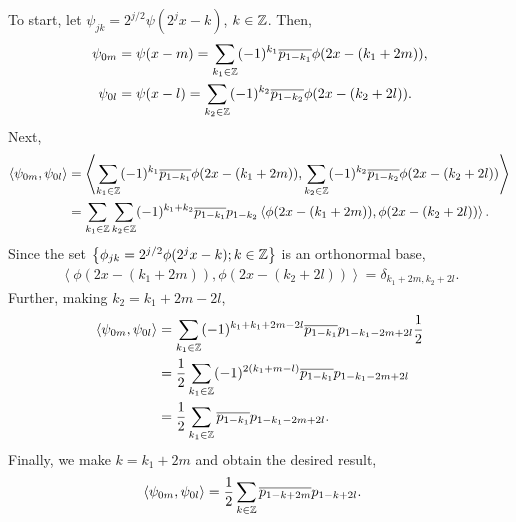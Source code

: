 \begin{questions}

\begin{solution}
To start, let $\psi_{jk}=2^{j/2}\psi(2^jx-k)$, $k\in\mathbb{Z}$. Then,
\begin{align*}
\psi_{0m}&=\psi(x-m)=\sum_{k_1\in\mathbb{Z}}(-1)^{k_1}\overline{p_{1-k_1}}\phi(2x-(k_1+2m)),\\
\psi_{0l}&=\psi(x-l)=\sum_{k_2\in\mathbb{Z}}(-1)^{k_2}\overline{p_{1-k_2}}\phi(2x-(k_2+2l)).
\end{align*}
Next, 
\begin{align*}
\left\langle \psi_{0m},\psi_{0l}\right\rangle&=\left\langle \sum_{k_1\in\mathbb{Z}}(-1)^{k_1}\overline{p_{1-k_1}}\phi(2x-(k_1+2m)),\sum_{k_2\in\mathbb{Z}}(-1)^{k_2}\overline{p_{1-k_2}}\phi(2x-(k_2+2l))\right\rangle\\
&=\sum_{k_1\in\mathbb{Z}}\sum_{k_2\in\mathbb{Z}}(-1)^{k_1+k_2}\overline{p_{1-k_1}}p_{1-k_2}\left\langle \phi(2x-(k_1+2m)),\phi(2x-(k_2+2l))\right\rangle.
\end{align*}
Since the set $\left\lbrace\phi_{jk}=2^{j/2}\phi(2^jx-k); k\in\mathbb{Z}\right\rbrace$ is an orthonormal base,
\begin{align*}
\left\langle \phi(2x-(k_1+2m)),\phi(2x-(k_2+2l))\right\rangle=\delta_{k_1+2m,k_2+2l}.
\end{align*}
Further, making $k_2=k_1+2m-2l$,
\begin{align*}
\left\langle \psi_{0m},\psi_{0l}\right\rangle&=\sum_{k_1\in\mathbb{Z}}(-1)^{k_1+k_1+2m-2l}\overline{p_{1-k_1}}p_{1-k_1-2m+2l}\frac{1}{2}\\
&=\frac{1}{2}\sum_{k_1\in\mathbb{Z}}(-1)^{2(k_1+m-l)}\overline{p_{1-k_1}}p_{1-k_1-2m+2l}\\
&=\frac{1}{2}\sum_{k_1\in\mathbb{Z}}\overline{p_{1-k_1}}p_{1-k_1-2m+2l}.
\end{align*}
Finally, we make $k=k_1+2m$ and obtain the desired result,
\begin{align*}
\left\langle \psi_{0m},\psi_{0l}\right\rangle&=\frac{1}{2}\sum_{k\in\mathbb{Z}}\overline{p_{1-k+2m}}p_{1-k+2l}.
\end{align*}
\end{solution}
\end{questions}
